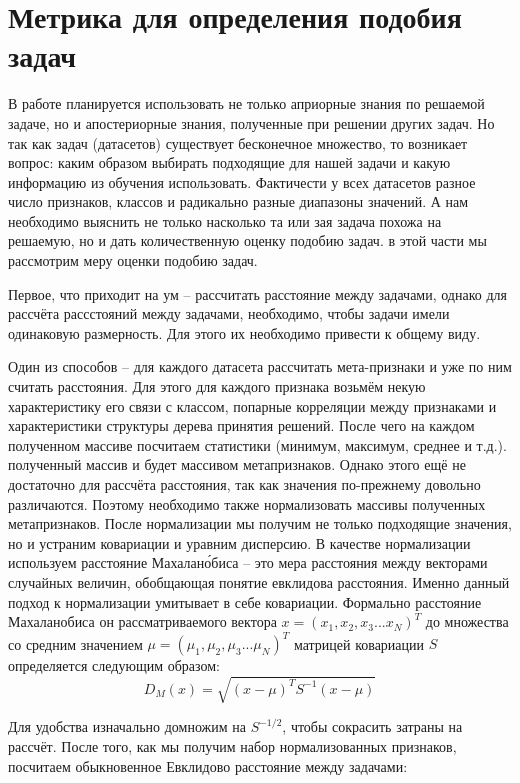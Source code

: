 \documentclass[times,specification,annotation]{itmo-student-thesis}
\begin{document}
	\section{Метрика для определения подобия задач} \label{s:metrics}
	В работе планируется использовать не только априорные знания по решаемой задаче, но и апостериорные знания, полученные при решении других задач. Но так как задач (датасетов) существует бесконечное множество, то возникает вопрос: каким образом выбирать подходящие для нашей задачи и какую информацию из обучения использовать. Фактичести у всех датасетов разное число признаков, классов и радикально разные диапазоны значений. А нам необходимо выяснить не только насколько та или зая задача похожа на решаемую, но и дать количественную оценку подобию задач. в этой части мы рассмотрим меру оценки подобию задач. \par
	Первое, что приходит на ум -- рассчитать расстояние между задачами, однако для рассчёта рассстояний между задачами, необходимо, чтобы задачи имели одинаковую размерность. Для этого их необходимо привести к общему виду. \par 
	Один из способов -- для каждого датасета рассчитать мета-признаки \cite{jomaa2019dataset2vec} и уже по ним считать расстояния. Для этого для каждого признака возьмём некую характеристику его связи с классом, попарные корреляции между признаками и характеристики структуры дерева принятия решений. После чего на каждом полученном массиве посчитаем статистики (минимум, максимум, среднее и т.д.). полученный массив и будет массивом метапризнаков. Однако этого ещё не достаточно для рассчёта расстояния, так как значения по-прежнему довольно различаются. Поэтому необходимо также нормализовать массивы полученных метапризнаков. После нормализации мы получим не только подходящие значения, но и устраним ковариации и уравним дисперсию. В качестве нормализации используем расстояние Махалан\'обиса -- это мера расстояния между векторами случайных величин, обобщающая понятие евклидова расстояния. Именно данный подход к нормализации умитывает в себе ковариации. Формально расстояние Махаланобиса он рассматриваемого вектора $ x=(x_{1},x_{2},x_{3}...x_{N})^{T} $ до множества со средним значением $ \mu=(\mu_{1},\mu_{2},\mu_{3}...\mu_{N})^{T} $ матрицей ковариации $ S $ определяется следующим образом:
	\begin{equation}
	\mathit D_{M}(x)=\sqrt{(x-\mu)^{T}S^{-1}(x-\mu)}
	\label{eq:meh}
	\end{equation}\par
	Для удобства изначально домножим на $ S^{-1/2} $, чтобы сокрасить затраны на рассчёт. После того, как мы получим набор нормализованных признаков, посчитаем обыкновенное Евклидово расстояние между задачами:
\end{document}
